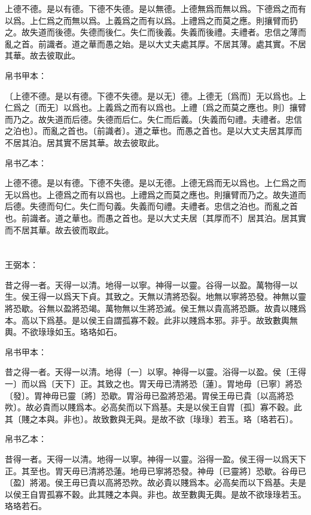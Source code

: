 \documentclass[a5paper]{ctexbook}
\begin{document}
    上德不德。是以有德。下德不失德。是以無德。上德無爲而無以爲。下德爲之而有以爲。上仁爲之而無以爲。上義爲之而有以爲。上禮爲之而莫之應。則攘臂而扔之。故失道而後德。失德而後仁。失仁而後義。失義而後禮。夫禮者。忠信之薄而亂之首。前識者。道之華而愚之始。是以大丈夫處其厚。不居其薄。處其實。不居其華。故去彼取此。

    
    帛书甲本：

    〔上德不德。是以有德。下德不失德。是以无〕德。上德无〔爲而〕无以爲也。上仁爲之〔而无〕以爲也。上義爲之而有以爲也。上禮〔爲之而莫之應也。則〕攘臂而乃之。故失道而后德。失德而后仁。失仁而后義。〔失義而句禮。夫禮者。忠信之泊也〕。而亂之首也。〔前識者〕。道之華也。而愚之首也。是以大丈夫居其厚而不居其泊。居其實不居其華。故去彼取此。

    帛书乙本：

    上德不德。是以有德。下德不失德。是以无德。上德无爲而无以爲也。上仁爲之而无以爲也。上德爲之而有以爲也。上禮爲之而莫之應也。則攘臂而乃之。故失道而后德。失德而句仁。失仁而句義。失義而句禮。夫禮者。忠信之泊也。而亂之首也。前識者。道之華也。而愚之首也。是以大丈夫居〔其厚而不〕居其泊。居其實而不居其華。故去彼而取此。

    \chapter{}
    王弼本：

    昔之得一者。天得一以清。地得一以寧。神得一以靈。谷得一以盈。萬物得一以生。侯王得一以爲天下貞。其致之。天無以清將恐裂。地無以寧將恐發。神無以靈將恐歇。谷無以盈將恐竭。萬物無以生將恐滅。侯王無以貴高將恐蹶。故貴以賤爲本。高以下爲基。是以侯王自謂孤寡不穀。此非以賤爲本邪。非乎。故致數輿無輿。不欲琭琭如玉。珞珞如石。

    
    帛书甲本：

    昔之得一者。天得一以清。地得〔一〕以寧。神得一以靈。浴得一以盈。侯〔王得一〕而以爲〔天下〕正。其致之也。胃天毋已清將恐〔蓮〕。胃地毋〔已寧〕將恐〔發〕。胃神毋已靈〔將〕恐歇。胃浴毋已盈將恐渴。胃侯王毋已貴〔以高將恐欮〕。故必貴而以賤爲本。必高矣而以下爲基。夫是以侯王自胃〔孤〕寡不穀。此其〔賤之本與。非也〕。故致數與无與。是故不欲〔琭琭〕若玉。珞〔珞若石〕。

    帛书乙本：

    昔得一者。天得一以清。地得一以寧。神得一以靈。浴得一盈。侯王得一以爲天下正。其至也。胃天毋已清將恐蓮。地毋已寧將恐發。神毋〔已靈將〕恐歇。谷毋已〔盈〕將渴。侯王毋已貴以高將恐欮。故必貴以賤爲本。必高矣而以下爲基。夫是以侯王自胃孤寡不穀。此其賤之本與。非也。故至數輿无輿。是故不欲琭琭若玉。珞珞若石。
\end{document}
